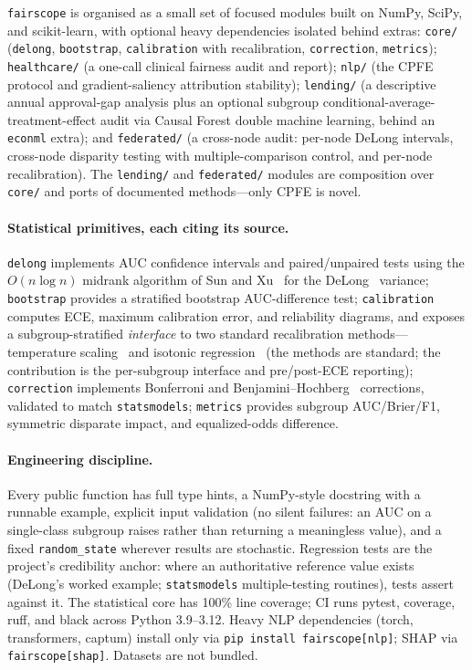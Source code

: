 \documentclass[11pt]{article}
\begin{document}
\texttt{fairscope} is organised as a small set of focused modules built on NumPy, SciPy, and
scikit-learn, with optional heavy dependencies isolated behind extras: \texttt{core/}
(\texttt{delong}, \texttt{bootstrap}, \texttt{calibration} with recalibration,
\texttt{correction}, \texttt{metrics}); \texttt{healthcare/} (a one-call clinical fairness
audit and report); \texttt{nlp/} (the CPFE protocol and gradient-saliency attribution
stability); \texttt{lending/} (a descriptive annual approval-gap analysis plus an optional
subgroup conditional-average-treatment-effect audit via Causal Forest double machine
learning, behind an \texttt{econml} extra); and \texttt{federated/} (a cross-node audit:
per-node DeLong intervals, cross-node disparity testing with multiple-comparison control, and
per-node recalibration). The \texttt{lending/} and \texttt{federated/} modules are
composition over \texttt{core/} and ports of documented methods---only CPFE is novel.

\paragraph{Statistical primitives, each citing its source.} \texttt{delong} implements AUC
confidence intervals and paired/unpaired tests using the $O(n \log n)$ midrank algorithm of
Sun and Xu~\cite{sunxu} for the DeLong~\cite{delong} variance; \texttt{bootstrap} provides a
stratified bootstrap AUC-difference test; \texttt{calibration} computes ECE, maximum
calibration error, and reliability diagrams, and exposes a subgroup-stratified \emph{interface}
to two standard recalibration methods---temperature scaling~\cite{guo} and isotonic
regression~\cite{zadrozny} (the methods are standard; the contribution is the per-subgroup
interface and pre/post-ECE reporting); \texttt{correction} implements Bonferroni and
Benjamini--Hochberg~\cite{bh} corrections, validated to match \texttt{statsmodels};
\texttt{metrics} provides subgroup AUC/Brier/F1, symmetric disparate impact, and
equalized-odds difference.

\paragraph{Engineering discipline.} Every public function has full type hints, a NumPy-style
docstring with a runnable example, explicit input validation (no silent failures: an AUC on a
single-class subgroup raises rather than returning a meaningless value), and a fixed
\texttt{random\_state} wherever results are stochastic. Regression tests are the project's
credibility anchor: where an authoritative reference value exists (DeLong's worked example;
\texttt{statsmodels} multiple-testing routines), tests assert against it. The statistical core
has 100\% line coverage; CI runs pytest, coverage, ruff, and black across Python 3.9--3.12.
Heavy NLP dependencies (torch, transformers, captum) install only via \texttt{pip install
fairscope[nlp]}; SHAP via \texttt{fairscope[shap]}. Datasets are not bundled.
\end{document}

